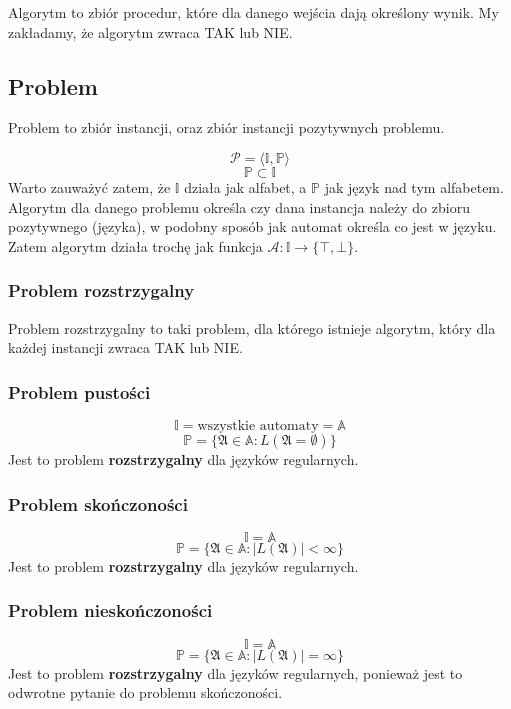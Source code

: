 \documentclass{../notatki}
\begin{document}
Algorytm to zbiór procedur, które dla danego wejścia dają określony
wynik. My zakładamy, że algorytm zwraca TAK lub NIE.

\subsection{Problem}

Problem to zbiór instancji, oraz zbiór instancji pozytywnych problemu.

$$
\mathcal{P} = \langle \mathbb{I}, \mathbb{P} \rangle
$$
$$
\mathbb{P} \subset \mathbb{I}
$$
Warto zauważyć zatem, że $\mathbb{I}$ działa jak alfabet, a
$\mathbb{P}$ jak język nad tym alfabetem.
Algorytm dla danego problemu określa czy dana instancja należy do
zbioru pozytywnego (języka), w podobny sposób jak automat określa co
jest w języku.
Zatem algorytm działa trochę jak funkcja $\mathcal{A}: \mathbb{I}
\rightarrow \{\top, \bot\}$.

\subsubsection{Problem rozstrzygalny}

Problem rozstrzygalny to taki problem, dla którego istnieje algorytm,
który dla każdej instancji zwraca TAK lub NIE.

\subsubsection{Problem pustości}

$$
\mathbb{I} = \text{wszystkie automaty} = \mathbb{A}
$$
$$
\mathbb{P} = \{\mathfrak{A} \in \mathbb{A} : L(\mathfrak{A} = \emptyset)\}
$$
Jest to problem \textbf{rozstrzygalny} dla języków regularnych.

\subsubsection{Problem skończoności}

$$
\mathbb{I} = \mathbb{A}
$$
$$
\mathbb{P} = \{\mathfrak{A} \in \mathbb{A} : |L(\mathfrak{A})| < \infty\}
$$
Jest to problem \textbf{rozstrzygalny} dla języków regularnych.

\subsubsection{Problem nieskończoności}

$$
\mathbb{I} = \mathbb{A}
$$
$$
\mathbb{P} = \{\mathfrak{A} \in \mathbb{A} : |L(\mathfrak{A})| = \infty\}
$$
Jest to problem \textbf{rozstrzygalny} dla języków regularnych,
ponieważ jest to odwrotne pytanie do problemu skończoności.
\end{document}
